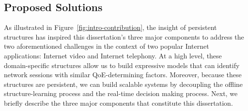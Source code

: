 \subsection{Proposed Solutions}
As illustrated in Figure~\ref{fig:intro-contribution}, 
the insight of persistent structures has inspired this dissertation's 
three major components 
to address the two aforementioned challenges in the context
of two popular Internet applications: Internet video and Internet telephony. 
At a high level, these domain-specific structures 
allow us to build expressive models that can identify network 
sessions with similar QoE-determining factors.
Moreover, because these structures are persistent, we can 
build scalable systems by decoupling the offline structure-learning 
process and the real-time decision making process.
Next, we briefly describe the three major components that constitute 
this dissertation.



